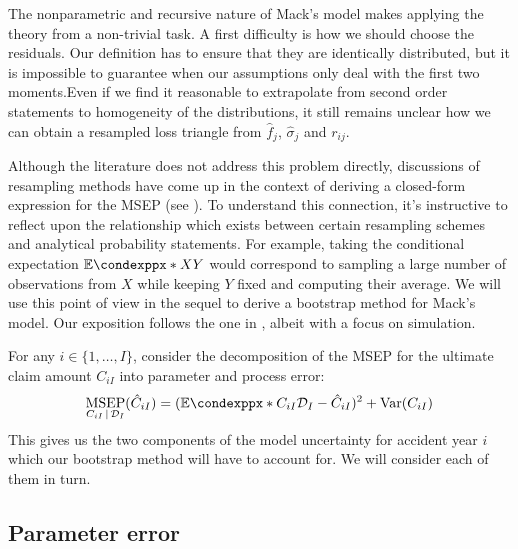 \documentclass[a4paper]{book}
\theoremstyle{plain}
\newcommand{\condexpp}{\mathbb{E}\condexppx}
\begin{document}
The nonparametric and recursive nature of Mack's model makes applying the theory from  a non-trivial task. A first difficulty is how we should choose the residuals. Our definition has to ensure that they are identically distributed, but it is impossible to guarantee when our assumptions only deal with the first two moments.Even if we find it reasonable to extrapolate from second order statements to homogeneity of the distributions, it still remains unclear how we can obtain a resampled loss triangle from $\hat{f}_j$, $\hat{\sigma}_j$ and $r_{ij}$. 

Although the literature does not address this problem directly, discussions of resampling methods have come up in the context of deriving a closed-form expression for the MSEP (see \cites{wuthrich:chain-ladder-msep}{mack:msep}{gisler:msep}{venter:msep}). To understand this connection, it's instructive to reflect upon the relationship which exists between certain resampling schemes and analytical probability statements. For example, taking the conditional expectation $\condexpp*{X}{Y}$ would correspond to sampling a large number of observations from $X$ while keeping $Y$ fixed and computing their average. We will use this point of view in the sequel to derive a bootstrap method for Mack's model. Our exposition follows the one in \cite[45\psqq]{wuthrich:stochastic-reserving}, albeit with a focus on simulation.

For any $i \in \{ 1, \dots, I \}$, consider the decomposition of the MSEP for the ultimate claim amount $C_{iI}$ into parameter and process error:
\begin{equation} \label{eq:msep}
    \underset{C_{iI} \, \vert \, \mathcal{D}_I}{\mathrm{MSEP}}(\hat{C}_{iI}) = (\condexpp*{C_{iI}}{\mathcal{D}_I} - \hat{C}_{iI})^2 + \mathrm{Var}(C_{iI})
\end{equation}
This gives us the two components of the model uncertainty for accident year $i$ which our bootstrap method will have to account for. We will consider each of them in turn.

\subsection{Parameter error}
\end{document}
